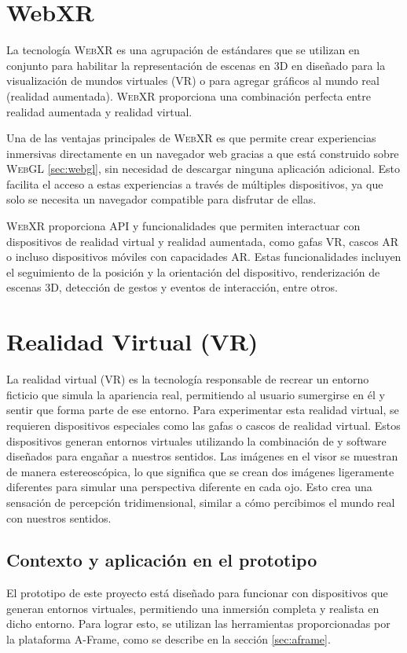 \documentclass[a4paper, 11pt]{book}
\begin{document}
\section{WebXR}
La tecnología \textsc{WebXR} es una agrupación de estándares que se utilizan en conjunto para habilitar la representación de escenas en 3D en  diseñado para la visualización de mundos virtuales (VR) o para agregar gráficos al mundo real (realidad aumentada). \textsc{WebXR} proporciona una combinación perfecta entre realidad aumentada y realidad virtual.

Una de las ventajas principales de \textsc{WebXR} es que permite crear experiencias inmersivas directamente en un navegador web gracias a que está construido sobre \textsc{WebGL} \ref{sec:webgl}, sin necesidad de descargar ninguna aplicación adicional. Esto facilita el acceso a estas experiencias a través de múltiples dispositivos, ya que solo se necesita un navegador compatible para disfrutar de ellas.

\textsc{WebXR} proporciona \textsc{\gls{API}} y funcionalidades que permiten interactuar con dispositivos de realidad virtual y realidad aumentada, como gafas \textsc{VR}, cascos \textsc{AR} o incluso dispositivos móviles con capacidades \textsc{AR}. Estas funcionalidades incluyen el seguimiento de la posición y la orientación del dispositivo, renderización de escenas \textsc{3D}, detección de gestos y eventos de interacción, entre otros.

\section{Realidad Virtual (VR)}
La realidad virtual (\textsc{VR}) es la tecnología responsable de recrear un entorno ficticio que simula la apariencia real, permitiendo al usuario sumergirse en él y sentir que forma parte de ese entorno. Para experimentar esta realidad virtual, se requieren dispositivos especiales como las gafas o cascos de realidad virtual. Estos dispositivos generan entornos virtuales utilizando la combinación de  y software diseñados para engañar a nuestros sentidos. Las imágenes en el visor se muestran de manera estereoscópica, lo que significa que se crean dos imágenes ligeramente diferentes para simular una perspectiva diferente en cada ojo. Esto crea una sensación de percepción tridimensional, similar a cómo percibimos el mundo real con nuestros sentidos.
\subsection{Contexto y aplicación en el prototipo}
El prototipo de este proyecto está diseñado para funcionar con dispositivos que generan entornos virtuales, permitiendo una inmersión completa y realista en dicho entorno. Para lograr esto, se utilizan las herramientas proporcionadas por la plataforma A-Frame, como se describe en la sección \ref{sec:aframe}. 
\end{document}
